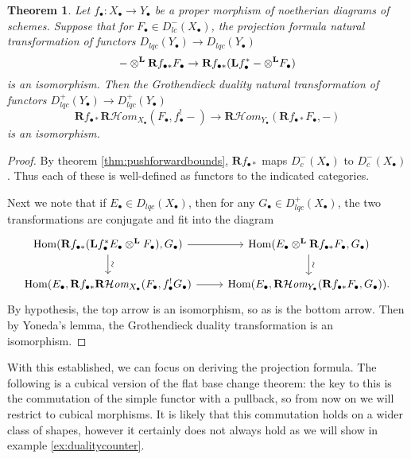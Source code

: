 \documentclass[proquest]{uwthesis}[2014/11/13]
\newtheorem{theorem}{Theorem}[section]
\theoremstyle{definition}
\DeclareMathOperator{\Hom}{Hom}
\newcommand{\cHom}{\mathcal{H} \textit{om}}
\newcommand{\bL}{\textbf{L}}
\newcommand{\bR}{\textbf{R}}
\newcommand{\otimesL}{\otimes^{\bf L}}
\begin{document}
\begin{theorem}
	Let $f_\bullet : X_\bullet \rightarrow Y_\bullet$ be a proper morphism of noetherian diagrams of schemes.
	Suppose that for $F_\bullet \in D_{lc}^-(X_\bullet)$, the projection formula natural transformation of functors $D_{lqc}(Y_\bullet) \rightarrow D_{lqc}(Y_\bullet)$
	\[
		- \otimesL \bR f_{\bullet *} F_\bullet \rightarrow \bR f_{\bullet *}(\bL f_\bullet^* - \otimesL F_\bullet)
	\]
	is an isomorphism.
	Then the Grothendieck duality natural transformation of functors ${D_{lqc}^+(Y_\bullet) \rightarrow D_{lqc}^+(Y_\bullet)}$
	\[
		\bR f_{\bullet *} \bR \cHom_{X_\bullet} (F_\bullet, f_\bullet^! -) \rightarrow \bR \cHom_{Y_\bullet} (\bR f_{\bullet *} F_\bullet, -)
	\]
	is an isomorphism.
\end{theorem}
\begin{proof}
	By theorem \ref{thm:pushforwardbounds}, $\bR f_{\bullet *}$ maps $D^-_{c}(X_\bullet)$ to $D_c^-(X_\bullet)$.
	Thus each of these is well-defined as functors to the indicated categories.
	
	Next we note that if $E_\bullet \in D_{lqc}(X_\bullet)$, then for any $G_\bullet \in D_{lqc}^+(X_\bullet)$, the two transformations are conjugate and fit into the diagram
	\[
	\begin{tikzcd}
		\Hom(\bR f_{\bullet *}(\bL f_\bullet^* E_\bullet \otimesL F_\bullet), G_\bullet) \arrow{d}[sloped, above]{\sim} \arrow{r} & \Hom(E_\bullet \otimesL \bR f_{\bullet *} F_\bullet, G_\bullet) \arrow{d}[sloped, above]{\sim} \\
		\Hom(E_\bullet, \bR f_{\bullet *} \bR \cHom_{X_\bullet} (F_\bullet, f_\bullet^! G_\bullet) \arrow{r} & \Hom(E_\bullet, \bR \cHom_{Y_\bullet} (\bR f_{\bullet *} F_\bullet, G_\bullet)).
	\end{tikzcd}
	\]
	By hypothesis, the top arrow is an isomorphism, so as is the bottom arrow.
	Then by Yoneda's lemma, the Grothendieck duality transformation is an isomorphism.
\end{proof}

With this established, we can focus on deriving the projection formula.
The following is a cubical version of the flat base change theorem: the key to this is the commutation of the simple functor with a pullback, so from now on we will restrict to cubical morphisms.
It is likely that this commutation holds on a wider class of shapes, however it certainly does not always hold as we will show in example \ref{ex:dualitycounter}.
\end{document}
